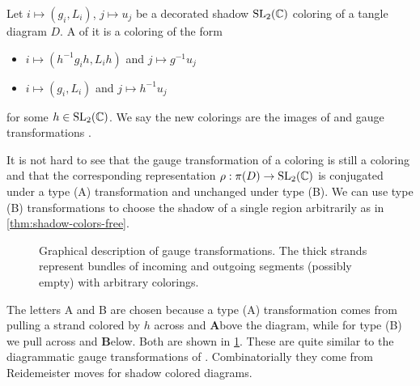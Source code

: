\documentclass[leqno]{sl2art}
\begin{document}
\begin{definition}
  Let \(i \mapsto (g_i, L_i)\), \(j \mapsto u_j\) be a decorated shadow \(\operatorname{SL}_2(\mathbb{C})\) coloring of a tangle diagram \(D\).
  A  of it is a coloring of the form
  \begin{itemize}
    \item[(A)] \(i \mapsto (h^{-1} g_i h, L_i h)\) and \(j \mapsto g^{-1} u_j\)
    \item[(B)] \(i \mapsto (g_i, L_i)\) and \(j \mapsto h^{-1} u_j\)
  \end{itemize}
  for some \(h \in \operatorname{SL}_2(\mathbb{C})\).
  We say the new colorings are the images of  and   gauge transformations  .
\end{definition}
It is not hard to see that the gauge transformation of a coloring is still a coloring and that the corresponding representation \(\rho : \pi(D) \to \operatorname{SL}_2(\mathbb{C})\) is conjugated under a type (A) transformation and unchanged under type (B).
We can use type (B) transformations to choose the shadow of a single region arbitrarily as in \cref{thm:shadow-colors-free}.

\begin{figure}
  \caption{
    Graphical description of gauge transformations.
    The thick strands represent bundles of incoming and outgoing segments (possibly empty) with arbitrary colorings.
  }
  \label{fig:gauge-transformation}
\end{figure}

The letters A and B are chosen because a type (A) transformation comes from pulling a strand colored by \(h\) across and \textbf{A}bove the diagram, while for type (B) we pull across and \textbf{B}elow.
Both are shown in \cref{fig:gauge-transformation}.
These are quite similar to the diagrammatic gauge transformations of \textcite[Section 3.3]{Blanchet2018}.
Combinatorially they come from Reidemeister moves for shadow colored diagrams.
\end{document}
